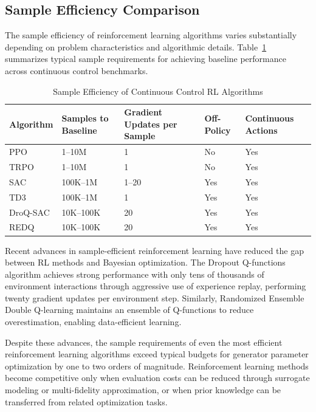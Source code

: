 \subsection{Sample Efficiency Comparison}
\label{subsec:rl_sample_efficiency}

The sample efficiency of reinforcement learning algorithms varies substantially depending on problem characteristics and algorithmic details. Table~\ref{tab:rl_efficiency} summarizes typical sample requirements for achieving baseline performance across continuous control benchmarks.

\begin{table}[htbp]
\centering
\caption{Sample Efficiency of Continuous Control RL Algorithms}
\label{tab:rl_efficiency}
\renewcommand{\arraystretch}{1.3}
\begin{tabular}{|p{2.5cm}|p{2.0cm}|p{2.5cm}|p{2.0cm}|p{2.5cm}|}
\hline
\textbf{Algorithm} & \textbf{Samples to Baseline} & \textbf{Gradient Updates per Sample} & \textbf{Off-Policy} & \textbf{Continuous Actions} \\
\hline
PPO & 1--10M & 1 & No & Yes \\
\hline
TRPO & 1--10M & 1 & No & Yes \\
\hline
SAC & 100K--1M & 1--20 & Yes & Yes \\
\hline
TD3 & 100K--1M & 1 & Yes & Yes \\
\hline
DroQ-SAC & 10K--100K & 20 & Yes & Yes \\
\hline
REDQ & 10K--100K & 20 & Yes & Yes \\
\hline
\end{tabular}
\end{table}

Recent advances in sample-efficient reinforcement learning have reduced the gap between RL methods and Bayesian optimization. The Dropout Q-functions algorithm achieves strong performance with only tens of thousands of environment interactions through aggressive use of experience replay, performing twenty gradient updates per environment step. Similarly, Randomized Ensemble Double Q-learning maintains an ensemble of Q-functions to reduce overestimation, enabling data-efficient learning.

Despite these advances, the sample requirements of even the most efficient reinforcement learning algorithms exceed typical budgets for generator parameter optimization by one to two orders of magnitude. Reinforcement learning methods become competitive only when evaluation costs can be reduced through surrogate modeling or multi-fidelity approximation, or when prior knowledge can be transferred from related optimization tasks.


